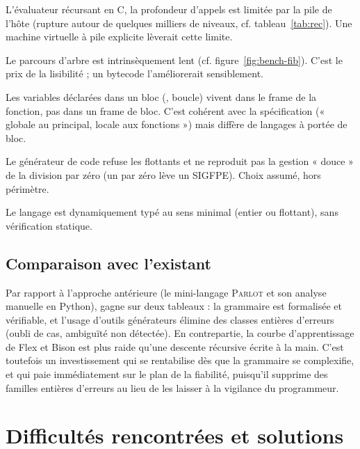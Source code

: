\begin{description}[style=nextline,leftmargin=1em]
  \item[Profondeur de récursion bornée.] L'évaluateur récursant en C, la
        profondeur d'appels \ilang{} est limitée par la pile de l'hôte (rupture
        autour de quelques milliers de niveaux, cf. tableau~\ref{tab:rec}). Une
        machine virtuelle à pile explicite lèverait cette limite.
  \item[Performance de l'interprétation.] Le parcours d'arbre est intrinsèquement
        lent (cf. figure~\ref{fig:bench-fib}). C'est le prix de la lisibilité ; un
        bytecode l'améliorerait sensiblement.
  \item[Absence de portée de bloc.] Les variables déclarées dans un bloc
        (, boucle) vivent dans le frame de la fonction, pas dans un frame
        de bloc. C'est cohérent avec la spécification (« globale au principal,
        locale aux fonctions ») mais diffère de langages à portée de bloc.
  \item[Back-end assembleur restreint aux entiers.] Le générateur de code refuse
        les flottants et ne reproduit pas la gestion « douce » de la division par
        zéro (un  par zéro lève un SIGFPE). Choix assumé, hors
        périmètre.
  \item[Pas de système de types.] Le langage est dynamiquement typé au sens
        minimal (entier ou flottant), sans vérification statique.
\end{description}

\subsection{Comparaison avec l'existant}

Par rapport à l'approche antérieure (le mini-langage \textsc{Parlot} et son
analyse manuelle en Python), \ilang{} gagne sur deux tableaux : la grammaire est
formalisée et vérifiable, et l'usage d'outils générateurs élimine des classes
entières d'erreurs (oubli de cas, ambiguïté non détectée). En contrepartie, la
courbe d'apprentissage de Flex et Bison est plus raide qu'une descente récursive
écrite à la main. C'est toutefois un investissement qui se rentabilise dès que la
grammaire se complexifie, et qui paie immédiatement sur le plan de la fiabilité,
puisqu'il supprime des familles entières d'erreurs au lieu de les laisser à la
vigilance du programmeur.

\section{Difficultés rencontrées et solutions}

